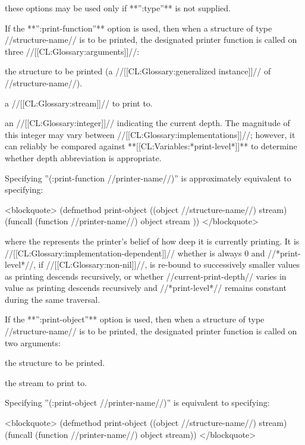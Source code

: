 these options may be used only if **'':type''** is not supplied.

If the **'':print-function''** option is used, then when a structure of type //structure-name// is to be printed, the designated printer function is called on three //[[CL:Glossary:arguments]]//:

\beginlist

\itemitem{--} the structure to be printed (a //[[CL:Glossary:generalized instance]]// of //structure-name//).

\itemitem{--} a //[[CL:Glossary:stream]]// to print to.

\itemitem{--} an //[[CL:Glossary:integer]]// indicating the current depth. The magnitude of this integer may vary between //[[CL:Glossary:implementations]]//; however, it can reliably be compared against **[[CL:Variables:*print-level*]]** to determine whether depth abbreviation is appropriate.

\endlist

Specifying ''(:print-function //printer-name//)'' is approximately equivalent to specifying:

<blockquote> (defmethod print-object ((object //structure-name//) stream) (funcall (function //printer-name//) object stream )) </blockquote>

where the  represents the printer's belief of how deep it is currently printing. It is //[[CL:Glossary:implementation-dependent]]// whether  is always 0 and //*print-level*//, if //[[CL:Glossary:non-nil]]//, is re-bound to successively smaller values as printing descends recursively, or whether //current-print-depth// varies in value as printing descends recursively and //*print-level*// remains constant during the same traversal.

If the **'':print-object''** option is used, then when a structure of type //structure-name// is to be printed, the designated printer function is called on two arguments:

\beginlist

\itemitem{--} the structure to be printed.

\itemitem{--} the stream to print to.

\endlist

Specifying ''(:print-object //printer-name//)'' is equivalent to specifying:

<blockquote> (defmethod print-object ((object //structure-name//) stream) (funcall (function //printer-name//) object stream)) </blockquote>

